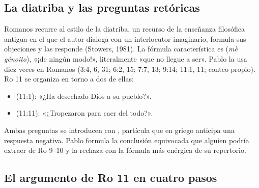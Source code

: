 \subsection{La diatriba y las preguntas retóricas}
Romanos recurre al estilo de la diatriba, un recurso de la enseñanza filosófica antigua en el que el autor dialoga con un interlocutor imaginario, formula sus objeciones y las responde (Stowers, 1981). La fórmula característica es  (\emph{mḕ génoito}), «¡de ningún modo!», literalmente «que no llegue a ser». Pablo la usa diez veces en Romanos (3:4, 6, 31; 6:2, 15; 7:7, 13; 9:14; 11:1, 11; conteo propio). Ro 11 se organiza en torno a dos de ellas:
\begin{itemize}
\item {} (11:1): «¿Ha desechado Dios a su pueblo?».
\item {} (11:11): «¿Tropezaron para caer del todo?».
\end{itemize}
Ambas preguntas se introducen con , partícula que en griego anticipa una respuesta negativa. Pablo formula la conclusión equivocada que alguien podría extraer de Ro 9--10 y la rechaza con la fórmula más enérgica de su repertorio.

\subsection{El argumento de Ro 11 en cuatro pasos}

